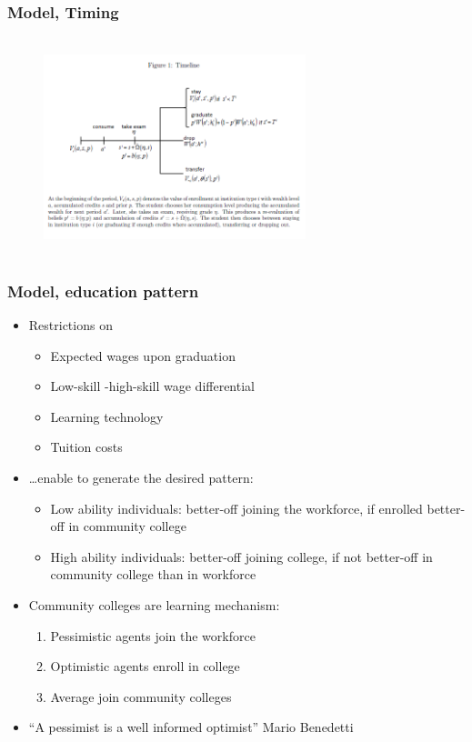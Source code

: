 \begin{frame}
	\frametitle{Model, Timing}
		\begin{figure}[H] 
			\caption*{}
			\centering
			\includegraphics[width=3in, height=2.5in]{Figures/T/figure1.png}
		\end{figure}
\end{frame}

\begin{frame}
	\frametitle{Model, education pattern}
		\begin{itemize}
			\item Restrictions on
				\begin{itemize}
					\item Expected wages upon graduation
					\item Low-skill -high-skill wage differential
					\item Learning technology
					\item Tuition costs
				\end{itemize}
			\item \ldots enable to generate the desired pattern:
				\begin{itemize}
					\item Low ability individuals: better-off joining the workforce, if enrolled better-off in community college
					\item High ability individuals: better-off joining college, if not better-off in community college than in workforce
				\end{itemize}
			\item Community colleges are learning mechanism:
				\begin{enumerate}
					\item Pessimistic agents join the workforce
					\item Optimistic agents enroll in college
					\item Average join community colleges 
				\end{enumerate}
			\item ``A pessimist is a well informed optimist'' Mario Benedetti  			
		\end{itemize}
\end{frame}

